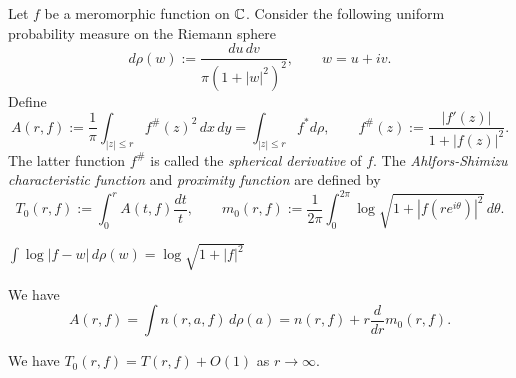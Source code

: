 \documentclass{../../large}
\begin{document}
\begin{prb}
Let $f$ be a meromorphic function on $\mathbb{C}$.
Consider the following uniform probability measure on the Riemann sphere
\[d\rho(w):=\frac{du\,dv}{\pi(1+|w|^2)^2},\qquad w=u+iv.\]
Define
\[A(r,f):=\frac1\pi\int_{|z|\le r}f^\#(z)^2\,dx\,dy=\int_{|z|\le r}f^*d\rho,\qquad f^\#(z):=\frac{|f'(z)|}{1+|f(z)|^2}.\]
The latter function $f^\#$ is called the \emph{spherical derivative} of $f$.
The \emph{Ahlfors-Shimizu characteristic function} and \emph{proximity function} are defined by
\[T_0(r,f):=\int_0^rA(t,f)\frac{dt}t,\qquad m_0(r,f):=\frac1{2\pi}\int_0^{2\pi}\log\sqrt{1+|f(re^{i\theta})|^2}\,d\theta.\]
\begin{parts}
\item $\int\log|f-w|\,d\rho(w)=\log\sqrt{1+|f|^2}$
\item We have
\[A(r,f)=\int n(r,a,f)\,d\rho(a)=n(r,f)+r\frac d{dr}m_0(r,f).\]
\item We have $T_0(r,f)=T(r,f)+O(1)$ as $r\to\infty$.
\end{parts}
\end{prb}
\end{document}
